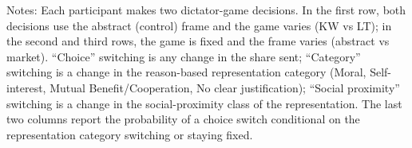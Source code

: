 \begin{table}[!htbp]
\centering
\caption{\textbf{Within-Subject Switching in the Dictator Game}}
\label{tab:within_switching_summary}
\begin{flushleft}
\footnotesize Notes: Each participant makes two dictator-game decisions. In the first row, both decisions use the abstract (control) frame and the game varies (KW vs LT); in the second and third rows, the game is fixed and the frame varies (abstract vs market). ``Choice'' switching is any change in the share sent; ``Category'' switching is a change in the reason-based representation category (Moral, Self-interest, Mutual Benefit/Cooperation, No clear justification); ``Social proximity'' switching is a change in the social-proximity class of the representation. The last two columns report the probability of a choice switch conditional on the representation category switching or staying fixed.
\end{flushleft}
\end{table}
